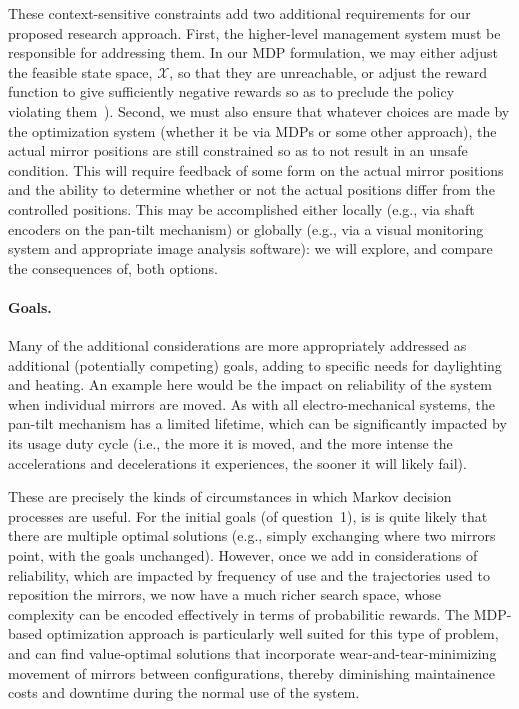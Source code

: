 These context-sensitive constraints add two additional requirements for
our proposed research approach.
First, the higher-level management system must be responsible for addressing them.
In our MDP formulation, we may either adjust the feasible state space, $\mathcal{X}$,
so that they are unreachable, or adjust the reward function to give sufficiently 
negative rewards so as to preclude the policy violating them~\cite{tblwgs11,tggs10}).
Second, we must also ensure that whatever choices are made by the optimization
system (whether it be via MDPs or some other approach), the actual
mirror positions are still constrained so as to not result in an
unsafe condition.  This will require feedback of some form on the actual
mirror positions and the ability to determine whether or not the actual
positions differ from the controlled positions.  This may be accomplished
either locally (e.g., via shaft encoders on the pan-tilt mechanism) or
globally (e.g., via a visual monitoring system and appropriate image analysis
software): we will explore, and compare the consequences of, both options.

\paragraph{Goals.}
Many of the additional considerations are more appropriately addressed as
additional (potentially competing) goals, adding to specific needs for
daylighting and heating.  An example here would be the
impact on reliability of the system when individual mirrors are moved.  As
with all electro-mechanical systems, the pan-tilt mechanism has a limited
lifetime, which can be significantly impacted by its usage duty cycle
(i.e., the more it is moved, and the more intense the accelerations and decelerations
it experiences, the sooner it will likely fail).

These are precisely the kinds of circumstances in which Markov decision
processes are useful. For the initial goals (of question~1), is is quite
likely that there are multiple optimal solutions (e.g., simply exchanging
where two mirrors point, with the goals unchanged).  However,
once we add in considerations of reliability, which are impacted by
frequency of use and the trajectories used to reposition the mirrors, 
we now have a much richer search space, whose complexity can be encoded
effectively in terms of probabilitic rewards.
The MDP-based optimization approach is particularly well suited for
this type of problem, and can find value-optimal solutions that incorporate
wear-and-tear-minimizing movement of mirrors between configurations, thereby 
diminishing maintainence costs and downtime during the normal use of the system.

